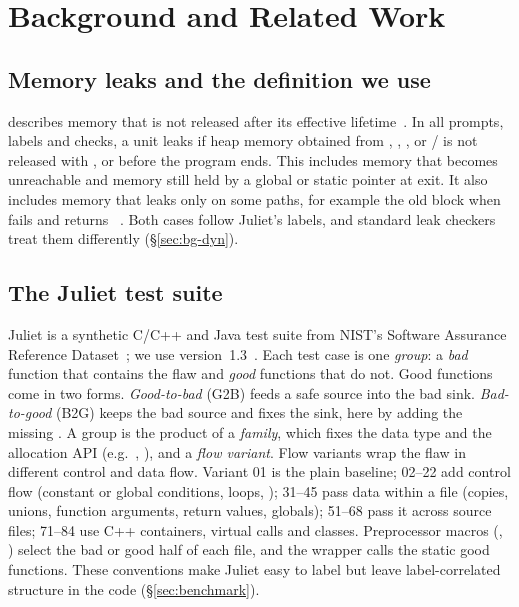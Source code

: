 \section{Background and Related Work}
\label{sec:background}

\subsection{Memory leaks and the definition we use}
\cwe{} describes memory that is not released after its effective lifetime~\cite{mitrecwe401}.
In all prompts, labels and checks, a unit leaks if heap memory obtained from , , ,  or / is not released with ,  or  before the program ends.
This includes memory that becomes unreachable and memory still held by a global or static pointer at exit.
It also includes memory that leaks only on some paths, for example the old block when  fails and returns ~\cite{cppreference_realloc}.
Both cases follow Juliet's labels, and standard leak checkers treat them differently (\S\ref{sec:bg-dyn}).

\subsection{The Juliet test suite}
Juliet is a synthetic C/C++ and Java test suite from NIST's Software Assurance Reference Dataset~\cite{boland2012juliet,sard}; we use version~1.3~\cite{black2018juliet13,sardjuliet13}.
Each test case is one \emph{group}: a \emph{bad} function that contains the flaw and \emph{good} functions that do not.
Good functions come in two forms.
\emph{Good-to-bad} (G2B) feeds a safe source into the bad sink.
\emph{Bad-to-good} (B2G) keeps the bad source and fixes the sink, here by adding the missing .
A group is the product of a \emph{family}, which fixes the data type and the allocation API (e.g.\ , ), and a \emph{flow variant}.
Flow variants wrap the flaw in different control and data flow.
Variant 01 is the plain baseline; 02--22 add control flow (constant or global conditions, loops, ); 31--45 pass data within a file (copies, unions, function arguments, return values, globals); 51--68 pass it across source files; 71--84 use C++ containers, virtual calls and classes.
Preprocessor macros (, ) select the bad or good half of each file, and the  wrapper calls the static good functions.
These conventions make Juliet easy to label but leave label-correlated structure in the code (\S\ref{sec:benchmark}).

